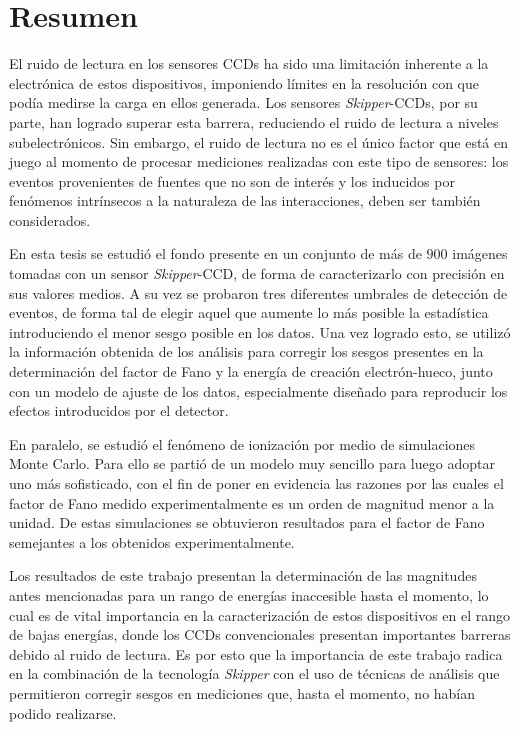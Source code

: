 \newpage
\chapter*{Resumen}
\thispagestyle{empty}
\noindent El ruido de lectura en los sensores CCDs ha sido una limitación inherente a la electrónica de estos dispositivos, imponiendo límites en la resolución con que podía medirse la carga en ellos generada. Los sensores \textit{Skipper}-CCDs, por su parte, han logrado superar esta barrera, reduciendo el ruido de lectura a niveles subelectrónicos. Sin embargo, el ruido de lectura no es el único factor que está en juego al momento de procesar mediciones realizadas con este tipo de sensores: los eventos provenientes de fuentes que no son de interés y los inducidos por fenómenos intrínsecos a la naturaleza de las interacciones, deben ser también considerados.


En esta tesis se estudió el fondo presente en un conjunto de más de $900$ imágenes tomadas con un sensor \textit{Skipper}-CCD, de forma de caracterizarlo con precisión en sus valores medios. A su vez se probaron tres diferentes umbrales de detección de eventos, de forma tal de elegir aquel que aumente lo más posible la estadística introduciendo el menor sesgo posible en los datos. Una vez logrado esto, se utilizó la información obtenida de los análisis para corregir los sesgos presentes en la determinación del factor de Fano y la energía de creación electrón-hueco, junto con un modelo de ajuste de los datos, especialmente diseñado para reproducir los efectos introducidos por el detector.


En paralelo, se estudió el fenómeno de ionización por medio de simulaciones Monte Carlo. Para ello se partió de un modelo muy sencillo para luego adoptar uno más sofisticado, con el fin de poner en evidencia las razones por las cuales el factor de Fano medido experimentalmente es un orden de magnitud menor a la unidad. De estas simulaciones se obtuvieron resultados para el factor de Fano semejantes a los obtenidos experimentalmente.


Los resultados de este trabajo presentan la determinación de las magnitudes antes mencionadas para un rango de energías inaccesible hasta el momento, lo cual es de vital importancia en la caracterización de estos dispositivos en el rango de bajas energías, donde los CCDs convencionales presentan importantes barreras debido al ruido de lectura. Es por esto que la importancia de este trabajo radica en la combinación de la tecnología \textit{Skipper} con el uso de técnicas de análisis que permitieron corregir sesgos en mediciones que, hasta el momento, no habían podido realizarse.


\newpage
\thispagestyle{empty} \mbox{}
\thispagestyle{empty}
